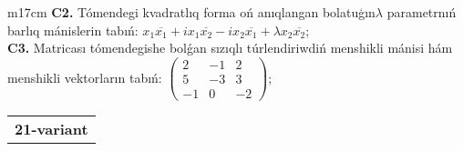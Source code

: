 \documentclass{article}
\begin{document}
\begin{tabular}{m{17cm}}
\textbf{C2.} Tómendegi kvadratlıq forma oń anıqlangan bolatuģın\(\lambda\) parametrnıń barlıq mánislerin tabıń: \(x_{1}\overline{x_{1}} + ix_{1}\overline{x_{2}} - ix_{2}\overline{x_{1}} + \lambda x_{2}\overline{x_{2}}\); \\
\textbf{C3.} Matricası tómendegishe bolǵan sızıqlı túrlendiriwdiń menshikli mánisi hám menshikli vektorların tabıń: \(\begin{pmatrix} 2 & - 1 & 2 \\ 5 & - 3 & 3 \\  - 1 & 0 & - 2 \end{pmatrix}\); \\

\end{tabular}
\vspace{1cm}


\begin{tabular}{m{17cm}}
\textbf{21-variant}
\newline


\end{tabular}
\end{document}
